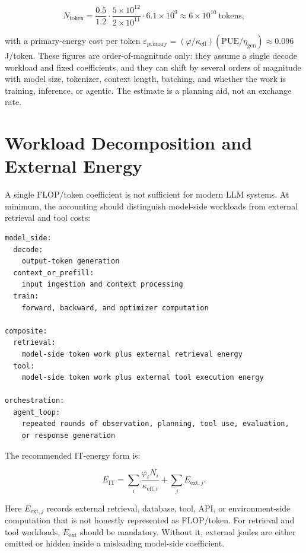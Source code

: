 \documentclass[11pt]{article}
\begin{document}
\begin{equation}
N_{\mathrm{token}} =
\frac{0.5}{1.2}\cdot\frac{5\times10^{12}}{2\times10^{11}}\cdot 6.1\times10^{9}
\approx 6\times10^{10}\ \text{tokens},
\end{equation}

with a primary-energy cost per token \(\varepsilon_{\mathrm{primary}} = (\varphi/\kappa_{\mathrm{eff}})(\mathrm{PUE}/\eta_{\mathrm{gen}}) \approx 0.096\) J/token. These figures are order-of-magnitude only: they assume a single decode workload and fixed coefficients, and they can shift by several orders of magnitude with model size, tokenizer, context length, batching, and whether the work is training, inference, or agentic. The estimate is a planning aid, not an exchange rate.

\section{Workload Decomposition and External Energy}

A single FLOP/token coefficient is not sufficient for modern LLM systems. At minimum, the accounting should distinguish model-side workloads from external retrieval and tool costs:

\begin{verbatim}
model_side:
  decode:
    output-token generation
  context_or_prefill:
    input ingestion and context processing
  train:
    forward, backward, and optimizer computation

composite:
  retrieval:
    model-side token work plus external retrieval energy
  tool:
    model-side token work plus external tool execution energy

orchestration:
  agent_loop:
    repeated rounds of observation, planning, tool use, evaluation,
    or response generation
\end{verbatim}

The recommended IT-energy form is:

\begin{equation}
E_{\mathrm{IT}} =
\sum_i
\frac{\varphi_i N_i}{\kappa_{\mathrm{eff},i}}
+
\sum_j E_{\mathrm{ext},j}.
\end{equation}

Here \(E_{\mathrm{ext},j}\) records external retrieval, database, tool, API, or environment-side computation that is not honestly represented as FLOP/token. For retrieval and tool workloads, \(E_{\mathrm{ext}}\) should be mandatory. Without it, external joules are either omitted or hidden inside a misleading model-side coefficient.
\end{document}
